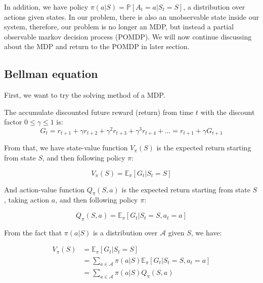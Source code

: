 \documentclass[
  a4paper, xcolor = usenames,dvipsnames]{article}
\theoremstyle{definition}
\theoremstyle{definition}
\theoremstyle{definition}
\theoremstyle{definition}
\theoremstyle{remark}
\begin{document}
In addition, we have policy \(\pi(a | S) = \mathbb{P}[A_{t} = a | S_{t} = S]\), a distribution over actions given states. In our problem, there is also an unobservable state inside our system, therefore, our problem is no longer an MDP, but instead a partial observable markov decision process (POMDP). We will now continue discussing about the MDP and return to the POMDP in later section.

\hypertarget{bellman-equation}{%
\subsection{Bellman equation}\label{bellman-equation}}

First, we want to try the solving method of a MDP.

The accumulate discounted future reward (return) from time \(t\) with the discount factor \(0 \le \gamma \le 1\) is:
\[
G_{t} = r_{t + 1} + \gamma r_{t + 2} + \gamma^{2} r_{t + 3} + \gamma^{3} r_{t + 4} + \dots = r_{t + 1} + \gamma G_{t + 1}
\]

From that, we have state-value function \(V_{\pi}(S)\) is the expected return starting from state \(S\), and then following policy \(\pi\):

\begin{equation}
V_{\pi}(S) = \mathbb{E}_{\pi}[G_{t} | S_{t} = S]
\label{eq:state-value}
\end{equation}

And action-value function \(Q_{\pi}(S, a)\) is the expected return starting from state \(S\), taking action \(a\), and then following policy \(\pi\):

\begin{equation}
Q_{\pi}(S, a) = \mathbb{E}_{\pi}[G_{t} | S_{t} = S, a_{t} = a]
\label{eq:action-value}
\end{equation}

From the fact that \(\pi(a | S)\) is a distribution over \(\mathcal{A}\) given \(S\), we have:

\begin{equation}
\begin{split}
V_{\pi}(S) {}&= \mathbb{E}_{\pi}[G_{t} | S_{t} = S] \\
  &= \sum_{a \in \mathcal{A}} \pi(a | S) \mathbb{E}_{\pi}[G_{t} | S_{t} = S, a_{t} = a] \\
  &= \sum_{a \in \mathcal{A}} \pi(a | S) Q_{\pi}(S, a)
\label{eq:v-to-q}
\end{split}
\end{equation}
\end{document}
